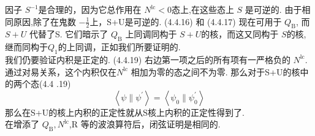 因子 $S^{-1}$是合理的，因为它总作用在 $N^{\mathrm{lc}}<0$态上,在这些态上 $S$ 是可逆的. 由于相同原因,除了在鬼数 $-\frac{1}{2}$上，S+U是可逆的. (4.4.16) 和 (4.4.17) 现在可用于 $Q_{\mathrm{B}}$, 而 $S+U$ 代替了S. 它们暗示了 $Q_{\mathrm{B}}$ 上同调同构于 $S+U$的核，而这又同构于 $S$的核, 继而同构于$Q_{1}$的上同调，正如我们所要证明的.\\
我们仍要验证内积是正定的.  (4.4.19) 右边第一项之后的所有项有一严格负的 $N^{\mathrm{lc}}$. 通过对易关系，这个内积仅在$N^{\mathrm{lc}}$ 相加为零的态之间不为零. 那么对于S+U的核中的两个态(4.4 .19)
\begin{equation}
\left\langle\psi \| \psi^{\prime}\right\rangle=\left\langle\psi_{0} \| \psi_{0}^{\prime}\right\rangle
\end{equation}
那么在S+U的核上内积的正定性就从S核上内积的正定性得到了.\\
 在增添了 $Q_{\mathrm{B}}, N^{\mathrm{lc}}$,R 等的波浪算符后，闭弦证明是相同的.\\

